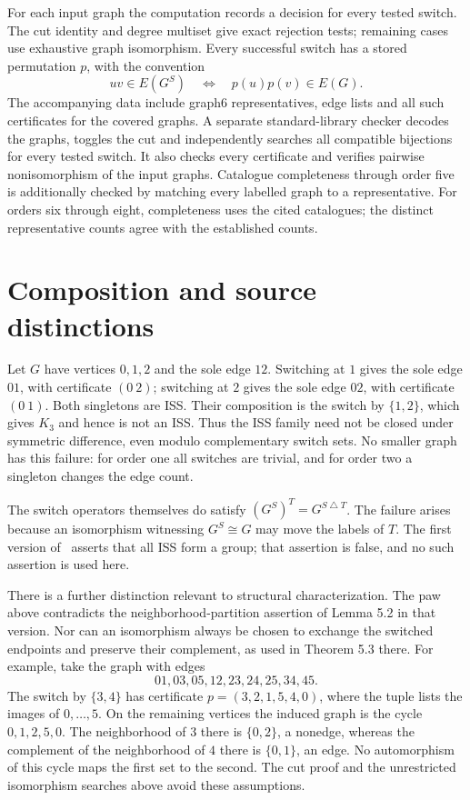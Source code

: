 \documentclass[11pt]{article}
\theoremstyle{definition}
\begin{document}
For each input graph the computation records a decision for every tested
switch. The cut identity and degree multiset give exact rejection tests;
remaining cases use exhaustive graph isomorphism. Every successful switch
has a stored permutation $p$, with the convention
\[
 uv\in E(G^S)\quad\Longleftrightarrow\quad p(u)p(v)\in E(G).
\]
The accompanying data include graph6 representatives, edge lists and all
such certificates for the covered graphs. A separate standard-library
checker decodes the graphs, toggles the cut and independently searches all
compatible bijections for every tested switch. It also checks every
certificate and verifies pairwise nonisomorphism of the input graphs.
Catalogue completeness through order five is additionally checked by
matching every labelled graph to a representative. For orders six through
eight, completeness uses the cited catalogues; the distinct representative
counts agree with the established counts.

\section{Composition and source distinctions}
Let $G$ have vertices $0,1,2$ and the sole edge $12$. Switching at $1$
gives the sole edge $01$, with certificate $(0\ 2)$; switching at $2$
gives the sole edge $02$, with certificate $(0\ 1)$. Both singletons
are ISS. Their composition is the switch by $\{1,2\}$, which gives
$K_3$ and hence is not an ISS. Thus the ISS family need not be closed
under symmetric difference, even modulo complementary switch sets.
No smaller graph has this failure: for order one all switches are
trivial, and for order two a singleton changes the edge count.

The switch operators themselves do satisfy
$(G^S)^T=G^{S\mathbin{\triangle}T}$. The failure arises because an
isomorphism witnessing $G^S\cong G$ may move the labels of $T$.
The first version of~\cite{gervacio} asserts that all ISS form a group; that assertion is false, and no such assertion is used here.

There is a further distinction relevant to structural characterization.
The paw above contradicts the neighborhood-partition assertion of
Lemma 5.2 in that version. Nor can an isomorphism always be chosen to
exchange the switched endpoints and preserve their complement, as used
in Theorem 5.3 there. For example, take the graph with edges
\[
 01,03,05,12,23,24,25,34,45.
\]
The switch by $\{3,4\}$ has certificate
$p=(3,2,1,5,4,0)$, where the tuple lists the images of $0,\ldots,5$.
On the remaining vertices the induced graph is the cycle $0,1,2,5,0$.
The neighborhood of $3$ there is $\{0,2\}$, a nonedge, whereas the
complement of the neighborhood of $4$ there is $\{0,1\}$, an edge.
No automorphism of this cycle maps the first set to the second.
The cut proof and the unrestricted isomorphism searches above avoid
these assumptions.
\end{document}
